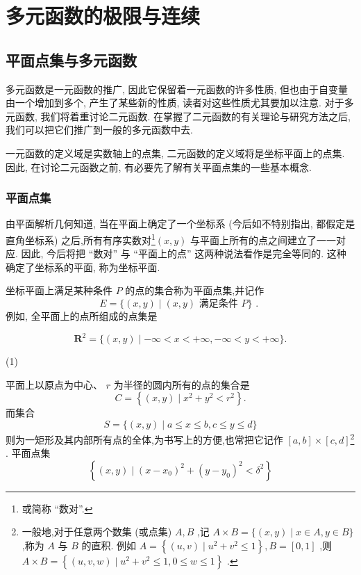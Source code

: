 \chapter{多元函数的极限与连续}

\section{平面点集与多元函数}

多元函数是一元函数的推广, 因此它保留着一元函数的许多性质, 但也由于自变量由一个增加到多个, 产生了某些新的性质, 读者对这些性质尤其要加以注意. 对于多元函数, 我们将着重讨论二元函数. 在掌握了二元函数的有关理论与研究方法之后, 我们可以把它们推广到一般的多元函数中去.

一元函数的定义域是实数轴上的点集, 二元函数的定义域将是坐标平面上的点集. 因此, 在讨论二元函数之前, 有必要先了解有关平面点集的一些基本概念.

\subsection{平面点集}

由平面解析几何知道, 当在平面上确定了一个坐标系 (今后如不特别指出, 都假定是直角坐标系) 之后,所有有序实数对\footnote{或简称 “数对”.}\(\left( {x,y}\right)\) 与平面上所有的点之间建立了一一对应. 因此, 今后将把 “数对” 与 “平面上的点” 这两种说法看作是完全等同的. 这种确定了坐标系的平面, 称为坐标平面.

坐标平面上满足某种条件 \(P\) 的点的集合称为平面点集,并记作
\[
E = \{ \left( {x,y}\right)  \mid  \left( {x,y}\right) \text{ 满足条件 }P\} \text{ . }
\]
例如, 全平面上的点所组成的点集是


\[
{\mathbf{R}}^{2} = \{ \left( {x,y}\right)  \mid   - \infty  < x <  + \infty , - \infty  < y <  + \infty \} .
\]


(1)

平面上以原点为中心、 \(r\) 为半径的圆内所有的点的集合是
\[
C = \left\{  {\left( {x,y}\right)  \mid  {x}^{2} + {y}^{2} < {r}^{2}}\right\}  . \tag{2}
\]
而集合
\[
S = \{ \left( {x,y}\right)  \mid  a \leq  x \leq  b,c \leq  y \leq  d\}  \tag{3}
\]
则为一矩形及其内部所有点的全体,为书写上的方便,也常把它记作 \(\left\lbrack  {a,b}\right\rbrack   \times  {\left\lbrack  c,d\right\rbrack  }\)\footnote{一般地,对于任意两个数集 (或点集) \(A,B\) ,记 \(A \times  B = \{ \left( {x,y}\right)  \mid  x \in  A,y \in  B\}\) ,称为 \(A\) 与 \(B\) 的直积. 例如 \(A = \left\{  {\left( {u,v}\right)  \mid  {u}^{2} + {v}^{2} \leq  1}\right\}  ,B = \left\lbrack  {0,1}\right\rbrack\) ,则 \(A \times  B = \left\{  {\left( {u,v,w}\right)  \mid  {u}^{2} + {v}^{2} \leq  1,0 \leq  w \leq  1}\right\}\) .} . 平面点集
\[
\left\{  {\left( {x,y}\right)  \mid  {\left( x - {x}_{0}\right) }^{2} + {\left( y - {y}_{0}\right) }^{2} < {\delta }^{2}}\right\}
\]





